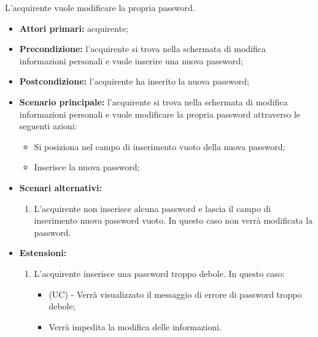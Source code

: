 L'acquirente vuole modificare la propria password.
\begin{itemize}
    \item \textbf{Attori primari:} acquirente;
    \item \textbf{Precondizione:} l'acquirente si trova nella schermata di modifica informazioni personali e vuole inserire una nuova password;
    \item \textbf{Postcondizione:} l'acquirente ha inserito la nuova password;
    \item \textbf{Scenario principale:} l'acquirente si trova nella schermata di modifica informazioni personali e vuole modificare la propria password attraverso le seguenti azioni:
    \begin{itemize}
        \item Si posiziona nel campo di inserimento vuoto della nuova password;
        \item Inserisce la nuova password;
    \end{itemize}
    \item \textbf{Scenari alternativi:}
    \begin{enumerate}[label=\lett]
        \item L'acquirente non inserisce alcuna password e lascia il campo di inserimento nuova password vuoto. In questo caso non verrà modificata la password.
    \end{enumerate}
    \item \textbf{Estensioni:}
    \begin{enumerate}[label=\lett]
        \item L'acquirente inserisce una password troppo debole. In questo caso:
        \begin{itemize}
            \item (UC) - Verrà visualizzato il messaggio di errore di password troppo debole;
            \item Verrà impedita la modifica delle informazioni.
        \end{itemize}
    \end{enumerate}
\end{itemize}

